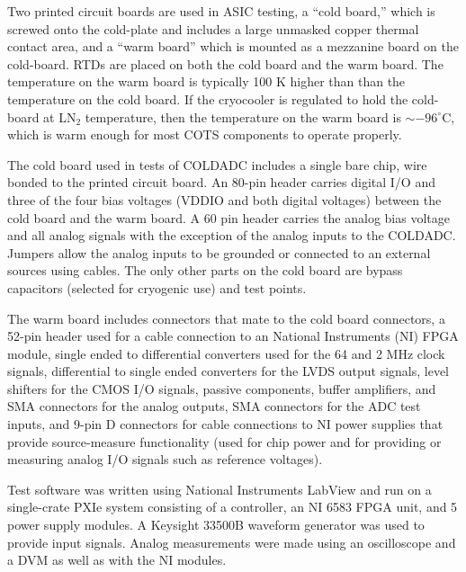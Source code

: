Two printed circuit boards are used in ASIC testing, a ``cold board,'' which is screwed onto the cold-plate and includes a large unmasked copper thermal contact area, and a ``warm board'' which is mounted as a mezzanine board on the cold-board.  RTDs are placed on both the cold board and the warm board.  The temperature on the warm board is typically 100 K higher than than the temperature on the cold board.  If the cryocooler is regulated to hold the cold-board at LN$_2$ temperature, then the temperature on the warm board is $\sim-96^{\circ}$C, which is warm enough for most COTS components to operate properly.

The cold board used in tests of COLDADC includes a single bare chip, wire bonded to the printed circuit board.  An 80-pin header carries digital I/O and three of the four bias voltages (VDDIO and both digital voltages) between the cold board and the warm board.  A 60 pin header carries the analog bias voltage and all analog signals with the exception of the analog inputs to the COLDADC.  Jumpers allow the analog inputs to be grounded or connected to an external sources using cables.  The only other parts on the cold board are bypass capacitors (selected for cryogenic use) and test points.

The warm board includes connectors that mate to the cold board connectors, a 52-pin header used for a cable connection to an National Instruments (NI) FPGA module, single ended to differential converters used for the 64 and 2 MHz clock signals, differential to single ended converters for the LVDS output signals, level shifters for the CMOS I/O signals, passive components, buffer amplifiers, and SMA connectors for the analog outputs, SMA connectors for the ADC test inputs, and 9-pin D connectors for cable connections to NI power supplies that provide source-measure functionality (used for chip power and for providing or measuring analog I/O signals such as reference voltages).

Test software was written using National Instruments LabView and run on a single-crate PXIe system consisting of a controller, an NI 6583 FPGA unit, and 5 power supply modules.  A Keysight 33500B waveform generator was used to provide input signals.  Analog measurements were made using an oscilloscope and a DVM as well as with the NI modules.

